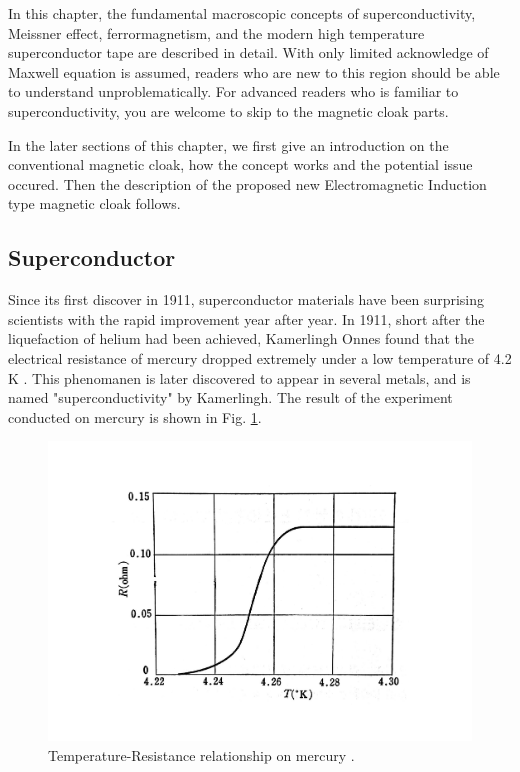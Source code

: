 In this chapter, the fundamental macroscopic concepts of superconductivity, Meissner effect, ferrormagnetism,
and the modern high temperature superconductor tape are described in detail.
With only limited acknowledge of Maxwell equation is assumed, readers who are new to this region should be able to understand unproblematically.
For advanced readers who is familiar to superconductivity, you are welcome to skip to the magnetic cloak parts.

In the later sections of this chapter, we first give an introduction on the conventional magnetic cloak,
how the concept works and the potential issue occured.
Then the description of the proposed new Electromagnetic Induction type magnetic cloak follows.


\newpage
\subsection{Superconductor}
Since its first discover in 1911, superconductor materials have been surprising scientists with the rapid improvement year after year.
In 1911, short after the liquefaction of helium had been achieved, Kamerlingh Onnes found that the electrical resistance of mercury dropped extremely under a low temperature of 4.2 K \cite{2_1}.
This phenomanen is later discovered to appear in several metals, and is named "superconductivity" by Kamerlingh.
The result of the experiment conducted on mercury is shown in Fig. \ref{fig:mercury}.
\begin{figure}[H]
  \includegraphics[width=20cm, bb=9 9 900 500]{./section2Proposal/mercury.pdf}
  \caption{Temperature-Resistance relationship on mercury \cite{2_2}.}
  \label{fig:mercury}
\end{figure}

